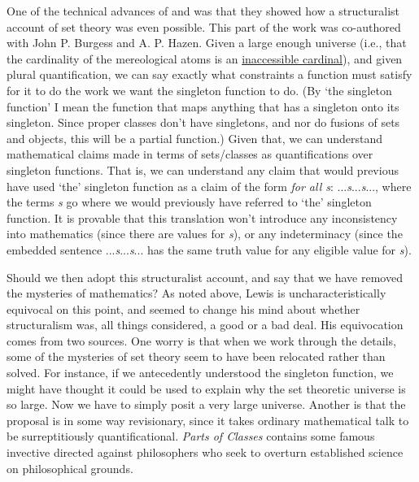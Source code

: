 One of the technical advances of \citeyearpar{Lewis1991a} and \citeyearpar{Lewis1993d} was that they showed how a structuralist account of set theory was even possible. This part of the work was co-authored with John P. Burgess and A. P. Hazen. Given a large enough universe (i.e., that the cardinality of the mereological atoms is an \href{http://plato.stanford.edu/set-theory/index.html#8}{inaccessible cardinal}), and given plural quantification, we can say exactly what constraints a function must satisfy for it to do the work we want the singleton function to do. (By `the singleton function' I mean the function that maps anything that has a singleton onto its singleton. Since proper classes don't have singletons, and nor do fusions of sets and objects, this will be a partial function.) Given that, we can understand mathematical claims made in terms of sets/classes as quantifications over singleton functions. That is, we can understand any claim that would previous have used `the' singleton function as a claim of the form \textit{for all s}: ...\textit{s}...\textit{s}..., where the terms \textit{s} go where we would previously have referred to `the' singleton function. It is provable that this translation won't introduce any inconsistency into mathematics (since there are values for \textit{s}), or any indeterminacy (since the embedded sentence ...\textit{s}...\textit{s}... has the same truth value for any eligible value for \textit{s}).

Should we then adopt this structuralist account, and say that we have removed the mysteries of mathematics? As noted above, Lewis is uncharacteristically equivocal on this point, and seemed to change his mind about whether structuralism was, all things considered, a good or a bad deal. His equivocation comes from two sources. One worry is that when we work through the details, some of the mysteries of set theory seem to have been relocated rather than solved. For instance, if we antecedently understood the singleton function, we might have thought it could be used to explain why the set theoretic universe is so large. Now we have to simply posit a very large universe. Another is that the proposal is in some way revisionary, since it takes ordinary mathematical talk to be surreptitiously quantificational. \textit{Parts of Classes} contains some famous invective directed against philosophers who seek to overturn established science on philosophical grounds.

